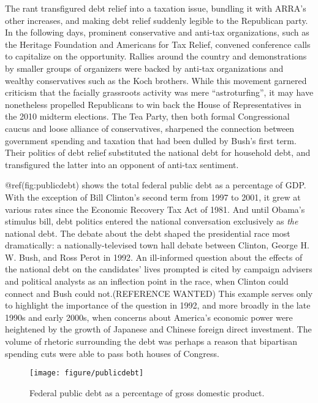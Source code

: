 \documentclass[
]{article}
\begin{document}
The rant transfigured debt relief into a taxation issue, bundling it
with ARRA's other increases, and making debt relief suddenly legible to
the Republican party. In the following days, prominent conservative and
anti-tax organizations, such as the Heritage Foundation and Americans
for Tax Relief, convened conference calls to capitalize on the
opportunity. Rallies around the country and demonstrations by smaller
groups of organizers were backed by anti-tax organizations and wealthy
conservatives such as the Koch brothers. While this movement garnered
criticism that the facially grassroots activity was mere
``astroturfing'', it may have nonetheless propelled Republicans to win
back the House of Representatives in the 2010 midterm elections. The Tea
Party, then both formal Congressional caucus and loose alliance of
conservatives, sharpened the connection between government spending and
taxation that had been dulled by Bush's first term. Their politics of
debt relief substituted the national debt for household debt, and
transfigured the latter into an opponent of anti-tax sentiment.

@ref(fig:publicdebt) shows the total federal public debt as a percentage
of GDP. With the exception of Bill Clinton's second term from 1997 to
2001, it grew at various rates since the Economic Recovery Tax Act of
1981. And until Obama's stimulus bill, debt politics entered the
national conversation exclusively as \emph{the} national debt. The
debate about the debt shaped the presidential race most dramatically: a
nationally-televised town hall debate between Clinton, George H. W.
Bush, and Ross Perot in 1992. An ill-informed question about the effects
of the national debt on the candidates' lives prompted is cited by
campaign advisers and political analysts as an inflection point in the
race, when Clinton could connect and Bush could not.(REFERENCE WANTED)
This example serves only to highlight the importance of the question in
1992, and more broadly in the late 1990s and early 2000s, when concerns
about America's economic power were heightened by the growth of Japanese
and Chinese foreign direct investment. The volume of rhetoric
surrounding the debt was perhaps a reason that bipartisan spending cuts
were able to pass both houses of Congress.

\begin{figure}

{\centering \texttt{[image: figure/publicdebt]}

}

\caption{Federal public debt as a percentage of gross domestic product.}\label{fig:publicdebt}
\end{figure}
\end{document}
